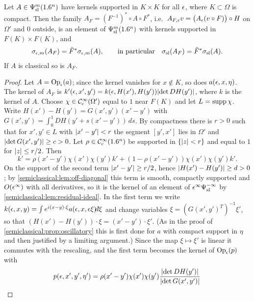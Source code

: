 \begin{proposition}\label{semiclassical:prop:invariance}
  Let $A\in\Psi^{m}_{\mathrm{sl}}(1.6^n)$ have kernels supported in $K\times K$ for all $\epsilon$, where
  $K\subset\Omega$ is compact. Then the family
  $A_F=(F^{-1})^*\circ A\circ F^*$, i.e.\ $A_{F,\epsilon}v=\bigl(A_\epsilon(v\circ F)\bigr)\circ H$
  on $\Omega'$ and $0$ outside, is an element of $\Psi^{m}_{\mathrm{sl}}(1.6^n)$ with kernels supported
  in $F(K)\times F(K)$, and
  \begin{equation*}
    \sigma_{\epsilon,m}(A_F)=\tilde F^*\sigma_{\epsilon,m}(A),\qquad\text{in particular}\quad
    \sigma_{\mathrm{sl}}(A_F)=\tilde F^*\sigma_{\mathrm{sl}}(A).
  \end{equation*}
  If $A$ is classical so is $A_F$.
\end{proposition}
\begin{proof}
  Let $A=\operatorname{Op}_\epsilon(a)$; since the kernel vanishes for $x\notin K$, so does
  $a(\epsilon,x,\eta)$. The kernel of $A_F$ is
  $k'(\epsilon,x',y')=k(\epsilon,H(x'),H(y'))\lvert \det DH(y')\rvert$, where $k$ is the kernel of
  $A$. Choose $\chi\in\mathcal{C}^\infty_{\mathrm{c}}(\Omega')$ equal to $1$ near $F(K)$ and let $L=\operatorname{supp}\chi$.
  Write $H(x')-H(y')=G(x',y')(x'-y')$ with $G(x',y')=\int_0^1DH(y'+s(x'-y'))\,ds$.
  By compactness there is $r>0$ such that for $x',y'\in L$ with $\lvert x'-y'\rvert<r$
  the segment $[y',x']$ lies in $\Omega'$ and $\lvert \det G(x',y')\rvert\ge c>0$. Let
  $\rho\in\mathcal{C}^\infty_{\mathrm{c}}(1.6^n)$ be supported in $\{\lvert z\rvert<r\}$ and equal to $1$ for
  $\lvert z\rvert\le r/2$. Then
  \begin{equation*}
    k'=\rho(x'-y')\chi(x')\chi(y')k'+(1-\rho(x'-y'))\chi(x')\chi(y')k'.
  \end{equation*}
  On the support of the second term $\lvert x'-y'\rvert\ge r/2$, hence
  $\lvert H(x')-H(y')\rvert\ge d>0$; by \cref{semiclassical:lem:off-diagonal} this term
  is smooth, compactly supported and $O(\epsilon^\infty)$ with all derivatives, so it
  is the kernel of an element of $\epsilon^\infty\Psi^{-\infty}_{\mathrm{sl}}$ by
  \cref{semiclassical:lem:residual-ideal}. In the first term we write
  $k(\eps,x,y)=\int e^{i(x-y)\cdot\xi}a(\eps,x,\eps\xi)\dbar\xi$ and change variables
  $\xi=(G(x',y')^T)^{-1}\xi'$, so that $(H(x')-H(y'))\cdot\xi=(x'-y')\cdot\xi'$. (As in
  the proof of \cref{semiclassical:prop:oscillatory} this is first done for $a$ with
  compact support in $\eta$ and then justified by a limiting argument.) Since the
  map $\xi\mapsto\xi'$ is linear it commutes with the rescaling, and the first term
  becomes the kernel of $\operatorname{Op}_\epsilon(p)$ with
  \begin{equation*}
    p(\eps,x',y',\eta')=\rho(x'-y')\chi(x')\chi(y')\frac{\abs{\det DH(y')}}{\abs{\det G(x',y')}}\,

\end{equation*}
\end{proof}
